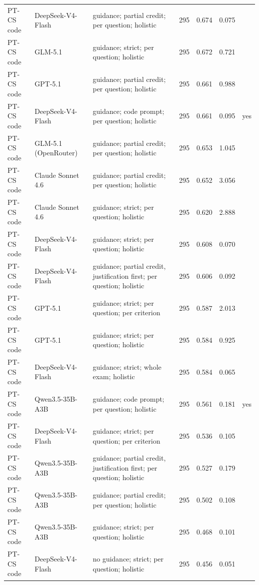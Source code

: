 \documentclass[10pt]{article}
\begin{document}
\begin{longtable}{ll>{\raggedright\arraybackslash}p{5.2cm}rrrc}
PT-CS code & DeepSeek-V4-Flash & guidance; partial credit; per question; holistic & 295 & 0.674 & 0.075 &  \\
PT-CS code & GLM-5.1 & guidance; strict; per question; holistic & 295 & 0.672 & 0.721 &  \\
PT-CS code & GPT-5.1 & guidance; partial credit; per question; holistic & 295 & 0.661 & 0.988 &  \\
PT-CS code & DeepSeek-V4-Flash & guidance; code prompt; per question; holistic & 295 & 0.661 & 0.095 & yes \\
PT-CS code & GLM-5.1 (OpenRouter) & guidance; partial credit; per question; holistic & 295 & 0.653 & 1.045 &  \\
PT-CS code & Claude Sonnet 4.6 & guidance; partial credit; per question; holistic & 295 & 0.652 & 3.056 &  \\
PT-CS code & Claude Sonnet 4.6 & guidance; strict; per question; holistic & 295 & 0.620 & 2.888 &  \\
PT-CS code & DeepSeek-V4-Flash & guidance; strict; per question; holistic & 295 & 0.608 & 0.070 &  \\
PT-CS code & DeepSeek-V4-Flash & guidance; partial credit, justification first; per question; holistic & 295 & 0.606 & 0.092 &  \\
PT-CS code & GPT-5.1 & guidance; strict; per question; per criterion & 295 & 0.587 & 2.013 &  \\
PT-CS code & GPT-5.1 & guidance; strict; per question; holistic & 295 & 0.584 & 0.925 &  \\
PT-CS code & DeepSeek-V4-Flash & guidance; strict; whole exam; holistic & 295 & 0.584 & 0.065 &  \\
PT-CS code & Qwen3.5-35B-A3B & guidance; code prompt; per question; holistic & 295 & 0.561 & 0.181 & yes \\
PT-CS code & DeepSeek-V4-Flash & guidance; strict; per question; per criterion & 295 & 0.536 & 0.105 &  \\
PT-CS code & Qwen3.5-35B-A3B & guidance; partial credit, justification first; per question; holistic & 295 & 0.527 & 0.179 &  \\
PT-CS code & Qwen3.5-35B-A3B & guidance; partial credit; per question; holistic & 295 & 0.502 & 0.108 &  \\
PT-CS code & Qwen3.5-35B-A3B & guidance; strict; per question; holistic & 295 & 0.468 & 0.101 &  \\
PT-CS code & DeepSeek-V4-Flash & no guidance; strict; per question; holistic & 295 & 0.456 & 0.051 &  \\

\end{longtable}
\end{document}
